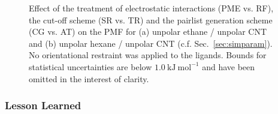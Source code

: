 \documentclass[9pt,lessons,pubversion]{livecoms}
\begin{document}
\begin{figure}[htb!]
  \centering    
  \caption{Effect of the treatment of electrostatic interactions (PME vs. RF), the cut-off scheme (SR vs. TR) and the pairlist generation scheme (CG vs. AT) on the PMF for (a) unpolar ethane / unpolar CNT 
  and (b) unpolar hexane / unpolar CNT (c.f. Sec.~\ref{sec:simparam}). 
  No orientational restraint was applied to the ligands. 
  Bounds for statistical uncertainties are below $1.0~\mathrm{kJ}~\mathrm{mol}^{-1}$ and have been omitted in the interest of clarity.
}  
\label{fig:UU_MultiLig_CNT_electrst}
\end{figure}


\subsubsection*{Lesson Learned}
\end{document}
